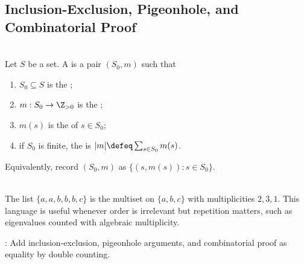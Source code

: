 \subsection{Inclusion-Exclusion, Pigeonhole, and Combinatorial Proof}

\begin{definition} \label{def:multisets-and-multiplicity} \\
Let $S$ be a set. A  is a pair $(S_0,m)$ such that
\begin{enumerate}[label=(\roman*)]
\setlength{\itemsep}{0pt}
\item $S_0\subseteq S$ is the ;
\item $m:S_0\to\Z_{>0}$ is the ;
\item $m(s)$ is the  of $s\in S_0$;
\item if $S_0$ is finite, the  is $\lvert m\rvert\defeq\sum_{s\in S_0}m(s)$.
\end{enumerate}
Equivalently, record $(S_0,m)$ as $\{(s,m(s)):s\in S_0\}$.
\end{definition}

\begin{example} \label{ex:multiset-eigenvalue-bookkeeping} \\
The list $\{a,a,b,b,b,c\}$ is the multiset on $\{a,b,c\}$ with multiplicities $2,3,1$.
This language is useful whenever order is irrelevant but repetition matters, such as eigenvalues counted with algebraic multiplicity.
\end{example}

: Add inclusion-exclusion, pigeonhole arguments, and combinatorial proof as equality by double counting.

